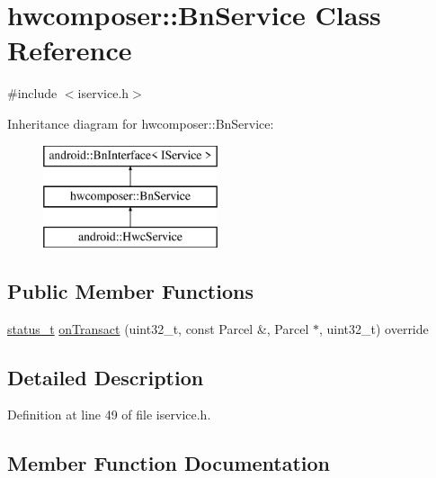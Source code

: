 \hypertarget{classhwcomposer_1_1BnService}{}\section{hwcomposer\+:\+:Bn\+Service Class Reference}
\label{classhwcomposer_1_1BnService}


{\ttfamily \#include $<$iservice.\+h$>$}

Inheritance diagram for hwcomposer\+:\+:Bn\+Service\+:\begin{figure}[H]
\begin{center}
\leavevmode
\includegraphics[height=3.000000cm]{classhwcomposer_1_1BnService}
\end{center}
\end{figure}
\subsection*{Public Member Functions}
\begin{DoxyCompactItemize}
\item 
\mbox{\hyperlink{hwcserviceapi_8h_a3806fb2027d9a316d8ca8d9b8b8eb96f}{status\+\_\+t}} \mbox{\hyperlink{classhwcomposer_1_1BnService_a75485c6ee8427b5128ebe08d42240e14}{on\+Transact}} (uint32\+\_\+t, const Parcel \&, Parcel $\ast$, uint32\+\_\+t) override
\end{DoxyCompactItemize}


\subsection{Detailed Description}


Definition at line 49 of file iservice.\+h.



\subsection{Member Function Documentation}
\mbox{\label{classhwcomposer_1_1BnService_a75485c6ee8427b5128ebe08d42240e14}} 
